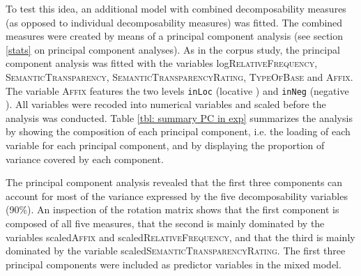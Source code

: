 To test this idea, an additional model with combined decomposability measures (as opposed to individual decomposability measures) was fitted. The combined measures were created by means of a principal component analysis (see section \ref{stats} on principal component analyses). 
As in the corpus study, the principal component analysis was fitted with the variables log\textsc{RelativeFrequency}, \textsc{SemanticTransparency}, \textsc{SemanticTransparencyRating}, \textsc{TypeOfBase} and \textsc{Affix}. The variable \textsc{Affix} features the two levels \texttt{inLoc} (locative ) and \texttt{inNeg} (negative ). All variables were recoded into numerical variables and scaled before the analysis was conducted. 
Table \ref{tbl: summary PC in exp} summarizes the analysis by showing the composition of each principal component, i.e. the loading of each variable for each principal component, and by displaying the proportion of variance covered by each component. 










The principal component analysis revealed that the first three components can account for most of the variance expressed by the five decomposability variables (90\%). An inspection of the rotation matrix shows that the first component is composed of all five measures, that the second is mainly dominated by the variables scaled\textsc{Affix} and scaled\textsc{RelativeFrequency}, and that the third is mainly dominated by the variable scaled\textsc{SemanticTransparencyRating}. 
The first three principal components were included as predictor variables in the mixed model.  

\clearpage


